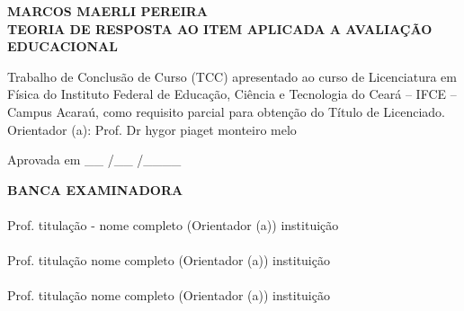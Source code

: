 \begin{center}
	    \textbf{MARCOS MAERLI PEREIRA}\\
		\vspace{2cm}
		\textbf{TEORIA DE RESPOSTA AO ITEM APLICADA A AVALIAÇÃO EDUCACIONAL}
\end{center}
	\vspace{2cm}
		\hspace{\mylength}\begin{minipage}{8cm}
			Trabalho de Conclusão de Curso (TCC) apresentado ao curso de Licenciatura em Física do Instituto Federal
			de Educação, Ciência e Tecnologia do
			Ceará – IFCE – Campus Acaraú, como requisito
			parcial para obtenção do Título de Licenciado.
			\vspace*{0.7cm}
			\\Orientador (a): Prof. Dr hygor piaget monteiro melo
		\end{minipage}
		\par
	 \vspace{1cm}
	    Aprovada em \_\_ /\_\_ /\_\_\_\_\\
	    \vspace{1cm}
	\begin{center} 
	   
	    \textbf{BANCA EXAMINADORA} \\
	    \vspace{1.5cm}
    	\hrulefill\\
    	Prof. titulação - nome completo (Orientador (a))
    	instituição\\
    	\vspace{1.5cm}
    	\hrulefill\\
    	Prof. titulação nome completo (Orientador (a))
    	instituição \\
    	\vspace{1.5cm}
    	\hrulefill\\
    	Prof. titulação nome completo (Orientador (a))
    	instituição
    \end{center}
    \newpage